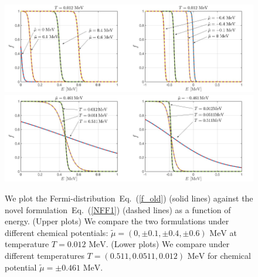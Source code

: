\documentclass[sn-mathphys,Numbered]{sn-jnl}
\newcommand{\req}[1]{Eq.~(\ref{#1})}
\newcommand*{\MeV}{\text{ MeV}}
\begin{document}
\begin{figure}[ht]
\centering
\includegraphics[width=0.5\textwidth]{./plot/Fermi_novel_001}\includegraphics[width=0.5\textwidth]{./plot/Fermi_novel_002}
\includegraphics[width=0.5\textwidth]{./plot/Fermi_novel_003}\includegraphics[width=0.5\textwidth]{./plot/Fermi_novel_004}
\caption{We plot the Fermi-distribution~\req{f_old} (solid lines) against the novel formulation~\req{NFF1} (dashed lines) as a function of energy. (Upper plots) We compare the two formulations under different chemical potentials: $\widetilde\mu=(0,\pm0.1,\pm0.4,\pm0.6)\MeV$ at temperature $T=0.012\MeV$. (Lower plots) We compare under different temperatures $T=(0.511,0.0511, 0.012)\MeV$ for chemical potential $\widetilde\mu=\pm0.461\MeV$.}
\label{Fermi_Checking}
\end{figure}
\end{document}
